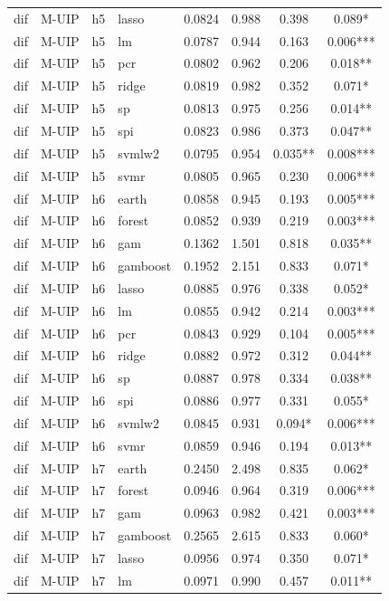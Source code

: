 \begin{ThreePartTable}
\begin{longtable}[t]{llclcccc}
dif & M-UIP & h5 & lasso & 0.0824 & 0.988 & 0.398 & 0.089*\\
dif & M-UIP & h5 & lm & 0.0787 & 0.944 & 0.163 & 0.006***\\
dif & M-UIP & h5 & pcr & 0.0802 & 0.962 & 0.206 & 0.018**\\
dif & M-UIP & h5 & ridge & 0.0819 & 0.982 & 0.352 & 0.071*\\
dif & M-UIP & h5 & sp & 0.0813 & 0.975 & 0.256 & 0.014**\\
dif & M-UIP & h5 & spi & 0.0823 & 0.986 & 0.373 & 0.047**\\
dif & M-UIP & h5 & svmlw2 & 0.0795 & 0.954 & 0.035** & 0.008***\\
dif & M-UIP & h5 & svmr & 0.0805 & 0.965 & 0.230 & 0.006***\\
\addlinespace
dif & M-UIP & h6 & earth & 0.0858 & 0.945 & 0.193 & 0.005***\\
dif & M-UIP & h6 & forest & 0.0852 & 0.939 & 0.219 & 0.003***\\
dif & M-UIP & h6 & gam & 0.1362 & 1.501 & 0.818 & 0.035**\\
dif & M-UIP & h6 & gamboost & 0.1952 & 2.151 & 0.833 & 0.071*\\
dif & M-UIP & h6 & lasso & 0.0885 & 0.976 & 0.338 & 0.052*\\
dif & M-UIP & h6 & lm & 0.0855 & 0.942 & 0.214 & 0.003***\\
dif & M-UIP & h6 & pcr & 0.0843 & 0.929 & 0.104 & 0.005***\\
dif & M-UIP & h6 & ridge & 0.0882 & 0.972 & 0.312 & 0.044**\\
dif & M-UIP & h6 & sp & 0.0887 & 0.978 & 0.334 & 0.038**\\
dif & M-UIP & h6 & spi & 0.0886 & 0.977 & 0.331 & 0.055*\\
dif & M-UIP & h6 & svmlw2 & 0.0845 & 0.931 & 0.094* & 0.006***\\
dif & M-UIP & h6 & svmr & 0.0859 & 0.946 & 0.194 & 0.013**\\
\addlinespace
dif & M-UIP & h7 & earth & 0.2450 & 2.498 & 0.835 & 0.062*\\
dif & M-UIP & h7 & forest & 0.0946 & 0.964 & 0.319 & 0.006***\\
dif & M-UIP & h7 & gam & 0.0963 & 0.982 & 0.421 & 0.003***\\
dif & M-UIP & h7 & gamboost & 0.2565 & 2.615 & 0.833 & 0.060*\\
dif & M-UIP & h7 & lasso & 0.0956 & 0.974 & 0.350 & 0.071*\\
dif & M-UIP & h7 & lm & 0.0971 & 0.990 & 0.457 & 0.011**\\

\end{longtable}
\end{ThreePartTable}

